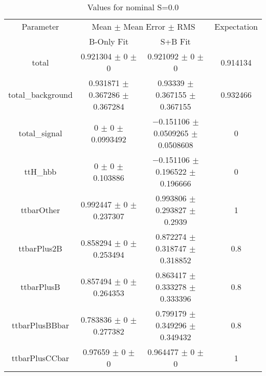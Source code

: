 \begin{table}
\centering
\caption{Values for nominal S=0.0}
\begin{tabular}{cccc}
\toprule
Parameter & \multicolumn{2}{c}{Mean $\pm$ Mean Error $\pm$ RMS} & Expectation\\
 & B-Only Fit & S+B Fit & \\
\midrule
total & \num{0.921304} $\pm$ \num{0} $\pm$ \num{0} & \num{0.921092} $\pm$ \num{0} $\pm$ \num{0} & \num{0.914134}\\
total\_background & \num{0.931871} $\pm$ \num{0.367286} $\pm$ \num{0.367284} & \num{0.93339} $\pm$ \num{0.367155} $\pm$ \num{0.367155} & \num{0.932466}\\
total\_signal & \num{0} $\pm$ \num{0} $\pm$ \num{0.0993492} & \num{-0.151106} $\pm$ \num{0.0509265} $\pm$ \num{0.0508608} & \num{0}\\
ttH\_hbb & \num{0} $\pm$ \num{0} $\pm$ \num{0.103886} & \num{-0.151106} $\pm$ \num{0.196522} $\pm$ \num{0.196666} & \num{0}\\
ttbarOther & \num{0.992447} $\pm$ \num{0} $\pm$ \num{0.237307} & \num{0.993806} $\pm$ \num{0.293827} $\pm$ \num{0.2939} & \num{1}\\
ttbarPlus2B & \num{0.858294} $\pm$ \num{0} $\pm$ \num{0.253494} & \num{0.872274} $\pm$ \num{0.318747} $\pm$ \num{0.318852} & \num{0.8}\\
ttbarPlusB & \num{0.857494} $\pm$ \num{0} $\pm$ \num{0.264353} & \num{0.863417} $\pm$ \num{0.333278} $\pm$ \num{0.333396} & \num{0.8}\\
ttbarPlusBBbar & \num{0.783836} $\pm$ \num{0} $\pm$ \num{0.277382} & \num{0.799179} $\pm$ \num{0.349296} $\pm$ \num{0.349432} & \num{0.8}\\
ttbarPlusCCbar & \num{0.97659} $\pm$ \num{0} $\pm$ \num{0} & \num{0.964477} $\pm$ \num{0} $\pm$ \num{0} & \num{1}\\
\bottomrule
\end{tabular}
\end{table}